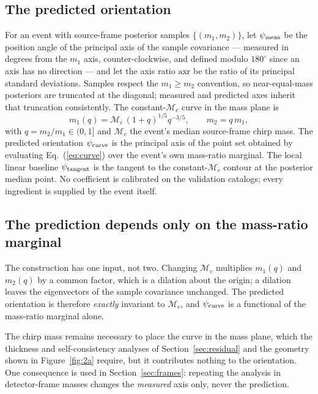 \documentclass[aps,preprint,amsmath,amssymb,nofootinbib,superscriptaddress]{revtex4-2}
\begin{document}
\subsection{The predicted orientation}
\label{sec:definition}
For an event with source-frame posterior samples $\{(m_1,m_2)\}$, let $\psi_{\rm meas}$ be the position
angle of the principal axis of the sample covariance --- measured in degrees from the $m_1$ axis,
counter-clockwise, and defined modulo $180^\circ$ since an axis has no direction --- and let the axis
ratio $\mathrm{axr}$ be the ratio of its principal standard deviations. Samples respect the
$m_1 \ge m_2$ convention, so near-equal-mass posteriors are truncated at the diagonal; measured and
predicted axes inherit that truncation consistently. The constant-$\mathcal{M}_c$ curve in the mass plane is
\begin{equation}
m_1(q) = \mathcal{M}_c\,(1+q)^{1/5} q^{-3/5}, \qquad m_2 = q\,m_1,
\label{eq:curve}
\end{equation}
with $q = m_2/m_1 \in (0,1]$ and $\mathcal{M}_c$ the event's median source-frame chirp mass. The predicted
orientation $\psi_{\rm curve}$ is the principal axis of the point set obtained by evaluating
Eq.~(\ref{eq:curve}) over the event's own mass-ratio marginal. The local linear baseline
$\psi_{\rm tangent}$ is the tangent to the constant-$\mathcal{M}_c$ contour at the posterior median point.
No coefficient is calibrated on the validation catalogs; every ingredient is supplied by the event itself.

\subsection{The prediction depends only on the mass-ratio marginal}
\label{sec:onlyq}
The construction has one input, not two. Changing $\mathcal{M}_c$ multiplies $m_1(q)$ and $m_2(q)$ by a
common factor, which is a dilation about the origin; a dilation leaves the eigenvectors of the sample
covariance unchanged. The predicted orientation is therefore \emph{exactly} invariant to $\mathcal{M}_c$,
and $\psi_{\rm curve}$ is a functional of the mass-ratio marginal alone.

The chirp mass remains necessary to place the curve in the mass plane, which the thickness and
self-consistency analyses of Section~\ref{sec:residual} and the geometry shown in Figure~\ref{fig:2a}
require, but it contributes nothing to the orientation. One consequence is used in
Section~\ref{sec:frames}: repeating the analysis in detector-frame masses changes the \emph{measured} axis
only, never the prediction.
\end{document}

